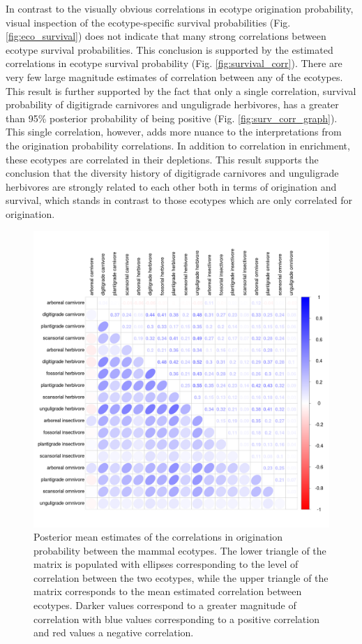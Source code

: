 In contrast to the visually obvious correlations in ecotype origination probability, visual inspection of the ecotype-specific survival probabilities (Fig. \ref{fig:eco_survival}) does not indicate that many strong correlations between ecotype survival probabilities. This conclusion is supported by the estimated correlations in ecotype survival probability (Fig. \ref{fig:survival_corr}). There are very few large magnitude estimates of correlation between any of the ecotypes. This result is further supported by the fact that only a single correlation, survival probability of digitigrade carnivores and unguligrade herbivores, has a greater than 95\% posterior probability of being positive (Fig. \ref{fig:surv_corr_graph}). This single correlation, however, adds more nuance to the interpretations from the origination probability correlations. In addition to correlation in enrichment, these ecotypes are correlated in their depletions. This result supports the conclusion that the diversity history of digitigrade carnivores and unguligrade herbivores are strongly related to each other both in terms of origination and survival, which stands in contrast to those ecotypes which are only correlated for origination.

\afterpage{\clearpage}
\begin{figure}[p]
  \centering
  \includegraphics[width=\textwidth,height=\textheight,keepaspectratio=true]{chapter_coping/figure/origination_correlation}
  \caption[Estimated correlations in origination probability between ecotypes]{Posterior mean estimates of the correlations in origination probability between the mammal ecotypes. The lower triangle of the matrix is populated with ellipses corresponding to the level of correlation between the two ecotypes, while the upper triangle of the matrix corresponds to the mean estimated correlation between ecotypes. Darker values correspond to a greater magnitude of correlation with blue values corresponding to a positive correlation and red values a negative correlation.}
  \label{fig:origin_corr}
\end{figure}

